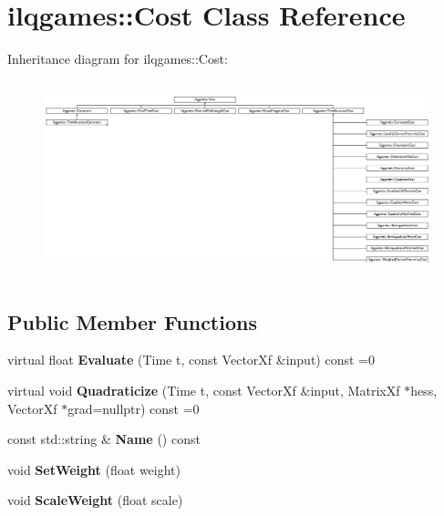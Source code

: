 \hypertarget{classilqgames_1_1_cost}{}\section{ilqgames\+:\+:Cost Class Reference}
\label{classilqgames_1_1_cost}
Inheritance diagram for ilqgames\+:\+:Cost\+:\begin{figure}[H]
\begin{center}
\leavevmode
\includegraphics[height=5.714286cm]{classilqgames_1_1_cost}
\end{center}
\end{figure}
\subsection*{Public Member Functions}
\begin{DoxyCompactItemize}
\item 
virtual float {\bfseries Evaluate} (Time t, const Vector\+Xf \&input) const =0\hypertarget{classilqgames_1_1_cost_a90ad7fc2697f0d8c3392dc5a079e40f9}{}\label{classilqgames_1_1_cost_a90ad7fc2697f0d8c3392dc5a079e40f9}

\item 
virtual void {\bfseries Quadraticize} (Time t, const Vector\+Xf \&input, Matrix\+Xf $\ast$hess, Vector\+Xf $\ast$grad=nullptr) const =0\hypertarget{classilqgames_1_1_cost_ade89b117df8b8ec0e491d121f9682aef}{}\label{classilqgames_1_1_cost_ade89b117df8b8ec0e491d121f9682aef}

\item 
const std\+::string \& {\bfseries Name} () const \hypertarget{classilqgames_1_1_cost_a7e21af3d7f23aee0d913ad5e2e0292cb}{}\label{classilqgames_1_1_cost_a7e21af3d7f23aee0d913ad5e2e0292cb}

\item 
void {\bfseries Set\+Weight} (float weight)\hypertarget{classilqgames_1_1_cost_a099e8ab748c378007cd63293ba928cae}{}\label{classilqgames_1_1_cost_a099e8ab748c378007cd63293ba928cae}

\item 
void {\bfseries Scale\+Weight} (float scale)\hypertarget{classilqgames_1_1_cost_abcf058c9ca728990f8f5b3c6acf4ead2}{}\label{classilqgames_1_1_cost_abcf058c9ca728990f8f5b3c6acf4ead2}

\end{DoxyCompactItemize}
